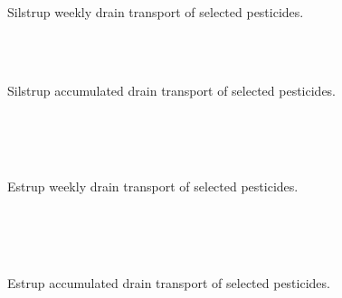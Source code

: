 \begin{figure}[htbp]
  \begin{center}
    \\
    \\
  \end{center}
  \caption{Silstrup weekly drain transport of selected pesticides.}
  \label{fig:Silstrup-weekly2}
\end{figure}

\begin{figure}[htbp]
  \begin{center}
    \\
    \\
  \end{center}
  \caption{Silstrup accumulated drain transport of selected pesticides.}
  \label{fig:Silstrup-acc}
\end{figure}

\begin{figure}[htbp]
  \begin{center}
    \\
    \\
    \\
  \end{center}
  \caption{Estrup weekly drain transport of selected pesticides.}
  \label{fig:Estrup-weekly}
\end{figure}

\begin{figure}[htbp]
  \begin{center}
    \\
    \\
    \\
  \end{center}
  \caption{Estrup accumulated drain transport of selected pesticides.}
  \label{fig:Estrup-acc}
\end{figure}


